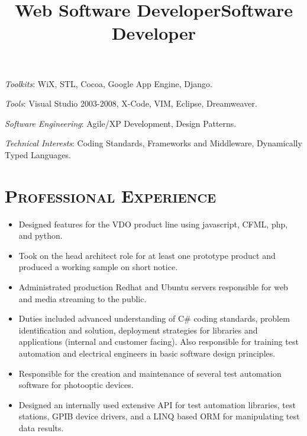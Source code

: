 \begin{resume}
\emph{Toolkits}: WiX, STL, Cocoa, Google App Engine, Django.

\emph{Tools}: Visual Studio 2003-2008, X-Code, VIM, Eclipse, Dreamweaver.

\emph{Software Engineering}: Agile/XP Development, Design Patterns.

\emph{Technical Interests}: Coding Standards, Frameworks and Middleware, Dynamically Typed Languages.

\section{\textsc{Professional Experience}}

\title{Web Software Developer}
\begin{position}
\begin{itemize}
\item Designed features for the VDO product line using javascript, CFML, php, and python.
\item Took on the head architect role for at least one prototype product and produced a working sample on short notice.
\item Administrated production Redhat and Ubuntu servers responsible for web and media streaming to the public.
\end{itemize}
\end{position}

\title{Software Developer}
\begin{position}
\begin{itemize}
\item Duties included advanced understanding of C\# coding standards, problem identification and solution, deployment strategies for libraries and applications (internal and customer facing). Also responsible for training test automation and electrical engineers in basic software design principles.
\item Responsible for the creation and maintenance of several test automation software for photooptic devices.
\item Designed an internally used extensive API for test automation libraries, test stations, GPIB device drivers, and a LINQ based ORM for manipulating test data results.
\end{itemize}
\end{position}


\end{resume}
